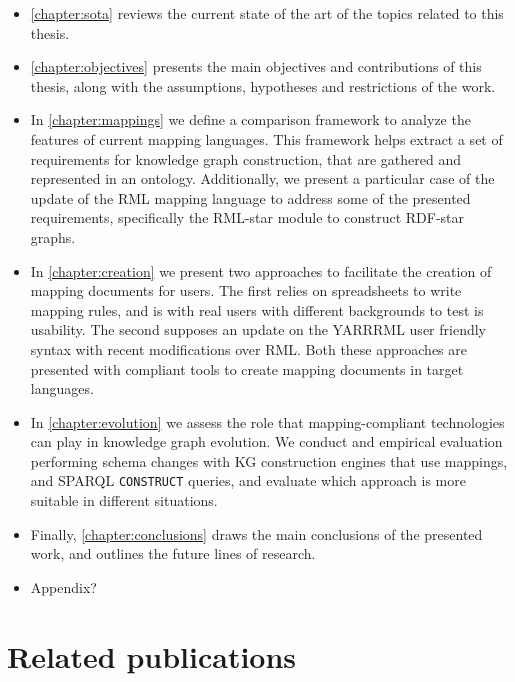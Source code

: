 \begin{itemize}
    \item \cref{chapter:sota} reviews the current state of the art of the topics related to this thesis. 
    
    \item \cref{chapter:objectives} presents the main objectives and contributions of this thesis, along with the assumptions, hypotheses and restrictions of the work. 
    
    \item In \cref{chapter:mappings} we define a comparison framework to analyze the features of current mapping languages. This framework helps extract a set of requirements for knowledge graph construction, that are gathered and represented in an ontology. Additionally, we present a particular case of the update of the RML mapping language to address some of the presented requirements, specifically the RML-star module to construct RDF-star graphs.
    
    \item In \cref{chapter:creation} we present two approaches to facilitate the creation of mapping documents for users. The first relies on spreadsheets to write mapping rules, and is with real users with different backgrounds to test is usability. The second supposes an update on the YARRRML user friendly syntax with recent modifications over RML. Both these approaches are presented with compliant tools to create mapping documents in target languages. 
    
    \item In \cref{chapter:evolution} we assess the role that mapping-compliant technologies can play in knowledge graph evolution. We conduct and empirical evaluation performing schema changes with KG construction engines that use mappings, and SPARQL \texttt{CONSTRUCT} queries, and evaluate which approach is more suitable in different situations. 
    
    \item Finally, \cref{chapter:conclusions} draws the main conclusions of the presented work, and outlines the future lines of research. 
    
    \item Appendix?
\end{itemize}


\section{Related publications}

